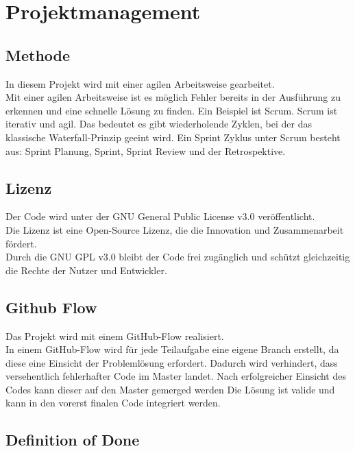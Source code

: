 \chapter{Projektmanagement}\label{ch:projektmanagement}

\section{Methode}\label{sec:methode}

In diesem Projekt wird mit einer agilen Arbeitsweise gearbeitet.\\
Mit einer agilen Arbeitsweise ist es möglich Fehler bereits in der Ausführung zu erkennen und eine schnelle Lösung zu finden.
Ein Beispiel ist Scrum. Scrum ist iterativ und agil. Das bedeutet es gibt wiederholende Zyklen, bei der das klassische Waterfall-Prinzip geeint wird.
Ein Sprint Zyklus unter Scrum besteht aus: Sprint Planung, Sprint, Sprint Review und der Retrospektive.

\section{Lizenz}\label{sec:lizenz}

Der Code wird unter der GNU General Public License v3.0 veröffentlicht.\\
Die Lizenz ist eine Open-Source Lizenz, die die Innovation und Zusammenarbeit fördert.\\
Durch die GNU GPL v3.0 bleibt der Code frei zugänglich und schützt gleichzeitig die Rechte der Nutzer und Entwickler. 


\section{Github Flow}\label{sec:github-flow}

Das Projekt wird mit einem GitHub-Flow realisiert.\\
In einem GitHub-Flow wird für jede Teilaufgabe eine eigene Branch erstellt, da diese eine Einsicht der Problemlösung erfordert.
Dadurch wird verhindert, dass versehentlich fehlerhafter Code im Master landet. Nach erfolgreicher Einsicht des Codes kann dieser auf den Master gemerged werden \dah{} Die Lösung ist valide und kann in den vorerst finalen Code integriert werden.



\section{Definition of Done}\label{sec:dod}

